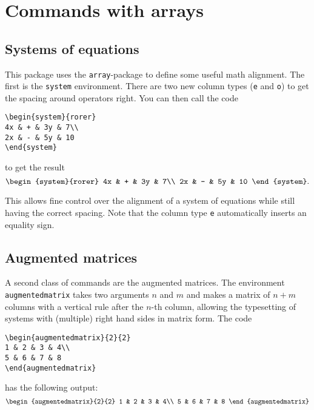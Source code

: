 \documentclass[12pt,a4paper]{article}
\begin{document}
\section{Commands with arrays}
\subsection{Systems of equations}
This package uses the \verb|array|-package to define some useful math alignment.
The first is the \verb|system| environment.
There are two new column types (\verb|e| and \verb|o|) to get the spacing around operators right.
You can then call the code

\begin{verbatim}
\begin{system}{rorer}
4x & + & 3y & 7\\
2x & - & 5y & 10
\end{system}
\end{verbatim}
to get the result
\[
\begin{system}{rorer}
4x & + & 3y & 7\\
2x & - & 5y & 10
\end{system}.
\]

This allows fine control over the alignment of a system of equations while still having the correct spacing.
Note that the column type \verb|e| automatically inserts an equality sign.

\subsection{Augmented matrices}

A second class of commands are the augmented matrices.
The environment \verb|augmentedmatrix| takes two arguments $n$ and $m$ and makes a matrix of $n+m$ columns with a vertical rule after the $n$-th column, allowing the typesetting of systems with (multiple) right hand sides in matrix form.
The code

\begin{verbatim}
\begin{augmentedmatrix}{2}{2}
1 & 2 & 3 & 4\\
5 & 6 & 7 & 8
\end{augmentedmatrix}
\end{verbatim}
has the following output:
\[
\begin{augmentedmatrix}{2}{2}
1 & 2 & 3 & 4\\
5 & 6 & 7 & 8
\end{augmentedmatrix}
\]
\end{document}
